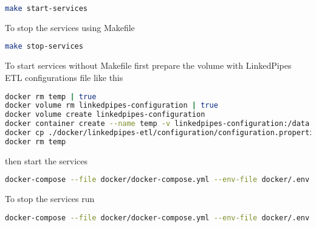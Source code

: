 \begin{lstlisting}[language=bash,]
make start-services
\end{lstlisting}

	To stop the services using Makefile
	
\begin{lstlisting}[language=bash,]
make stop-services
\end{lstlisting}		

	To start services without Makefile first prepare the volume with LinkedPipes ETL configurations file like this
	
\begin{lstlisting}[language=bash,]
docker rm temp | true
docker volume rm linkedpipes-configuration | true
docker volume create linkedpipes-configuration
docker container create --name temp -v linkedpipes-configuration:/data busybox
docker cp ./docker/linkedpipes-etl/configuration/configuration.properties temp:/data
docker rm temp
\end{lstlisting}		

	then start the services
	
\begin{lstlisting}[language=bash,]
docker-compose --file docker/docker-compose.yml --env-file docker/.env up -d
\end{lstlisting}

	To stop the services run

\begin{lstlisting}[language=bash,]
docker-compose --file docker/docker-compose.yml --env-file docker/.env down
\end{lstlisting}
